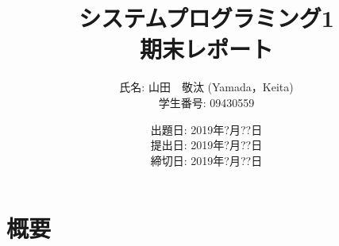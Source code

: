 \documentclass[a4j,11pt]{jarticle}
\title{システムプログラミング1 \\
       期末レポート}
\author{氏名: 山田　敬汰 (Yamada，Keita) \\
        学生番号: 09430559}
\date{出題日: 2019年?月??日 \\   %
      提出日: 2019年?月??日 \\
      締切日: 2019年?月??日 \\}  %
\begin{document}
\maketitle



\section{概要}





\end{document}
